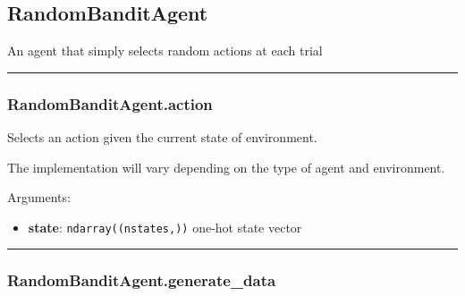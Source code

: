 \hypertarget{randombanditagent}{%
\subsection{RandomBanditAgent}\label{randombanditagent}}

\begin{Shaded}
\begin{Highlighting}[]
\end{Highlighting}
\end{Shaded}

An agent that simply selects random actions at each trial

\begin{center}\rule{0.5\linewidth}{\linethickness}\end{center}

\hypertarget{randombanditagent.action}{%
\subsubsection{RandomBanditAgent.action}\label{randombanditagent.action}}

\begin{Shaded}
\begin{Highlighting}[]
\end{Highlighting}
\end{Shaded}

Selects an action given the current state of environment.

The implementation will vary depending on the type of agent and
environment.

Arguments:

\begin{itemize}
\tightlist
\item
  \textbf{state}: \texttt{ndarray((nstates,))} one-hot state vector
\end{itemize}

\begin{center}\rule{0.5\linewidth}{\linethickness}\end{center}

\hypertarget{randombanditagent.generate_data}{%
\subsubsection{RandomBanditAgent.generate\_data}\label{randombanditagent.generate_data}}

